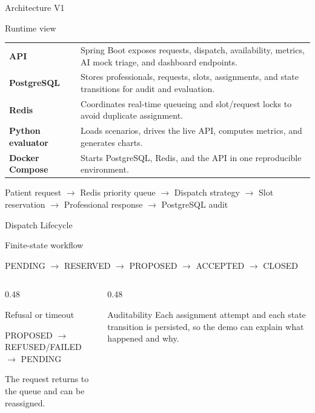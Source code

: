 \documentclass[aspectratio=169,11pt]{beamer}
\begin{document}
\begin{frame}{Architecture V1}
  \begin{block}{Runtime view}
    \begin{tabularx}{\textwidth}{>{\bfseries}l X}
      API & Spring Boot exposes requests, dispatch, availability, metrics, AI mock triage, and dashboard endpoints.\\
      PostgreSQL & Stores professionals, requests, slots, assignments, and state transitions for audit and evaluation.\\
      Redis & Coordinates real-time queueing and slot/request locks to avoid duplicate assignment.\\
      Python evaluator & Loads scenarios, drives the live API, computes metrics, and generates charts.\\
      Docker Compose & Starts PostgreSQL, Redis, and the API in one reproducible environment.
    \end{tabularx}
  \end{block}

  \vspace{0.2cm}
  \begin{center}
    \small Patient request $\rightarrow$ Redis priority queue $\rightarrow$ Dispatch strategy $\rightarrow$ Slot reservation $\rightarrow$ Professional response $\rightarrow$ PostgreSQL audit
  \end{center}
\end{frame}

\begin{frame}{Dispatch Lifecycle}
  \begin{block}{Finite-state workflow}
    \begin{center}
      \Large
      PENDING $\rightarrow$ RESERVED $\rightarrow$ PROPOSED $\rightarrow$ ACCEPTED $\rightarrow$ CLOSED
    \end{center}
  \end{block}

  \begin{columns}[T]
    \begin{column}{0.48\textwidth}
      \begin{block}{Refusal or timeout}
        \begin{center}
          PROPOSED $\rightarrow$ REFUSED/FAILED $\rightarrow$ PENDING
        \end{center}
        The request returns to the queue and can be reassigned.
      \end{block}
    \end{column}
    \begin{column}{0.48\textwidth}
      \begin{block}{Auditability}
        Each assignment attempt and each state transition is persisted, so the demo can explain what happened and why.
      \end{block}
    \end{column}
  \end{columns}
\end{frame}
\end{document}
